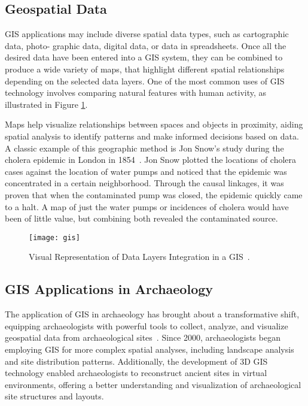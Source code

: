 \subsection{Geospatial Data} 
\label{sub:geospatial_data}

\gls{GIS} applications may include diverse spatial data types, such as cartographic data, photo-
graphic data, digital data, or data in spreadsheets. Once all the desired data have been
entered into a \gls{GIS} system, they can be combined to produce a wide variety of maps,
that highlight different spatial relationships depending on the selected data layers. 
One of the most common uses of
\gls{GIS} technology involves comparing natural features with human activity, as illustrated in Figure \ref{fig:gis}.

Maps help visualize relationships between spaces and objects in proximity, aiding spatial analysis to identify patterns and make informed decisions based on data.
A classic example of this geographic method is Jon Snow's study during the cholera epidemic in London in 1854~\cite{inbook}. Jon Snow plotted the locations of cholera cases against the location of water pumps and noticed that the epidemic was concentrated in a certain neighborhood. 
Through the causal linkages, it was proven that when the contaminated pump was closed, the epidemic quickly came to a halt. 
A map of just the water pumps or incidences of cholera would have been of little value, but combining both revealed the contaminated source. 
\begin{figure}[h!]
    \centering
    \texttt{[image: gis]}
    \caption{Visual Representation of Data Layers Integration in a \gls{GIS}~\cite{gao_data_layers}.}
    \label{fig:gis}
\end{figure}
\FloatBarrier

\subsection{GIS Applications in Archaeology}
\label{sub:gis_archeology}

The application of \gls{GIS} in archaeology has brought about a transformative shift, equipping archaeologists with powerful tools to collect, analyze, 
and visualize geospatial data from archaeological sites~\cite{yao2023overview}. Since 2000, archaeologists began employing \gls{GIS} for more complex spatial analyses, including landscape analysis and site distribution 
patterns. Additionally, the development of \gls{3D} \gls{GIS} technology enabled archaeologists to reconstruct ancient sites in virtual environments, offering a 
better understanding and visualization of archaeological site structures and layouts.

